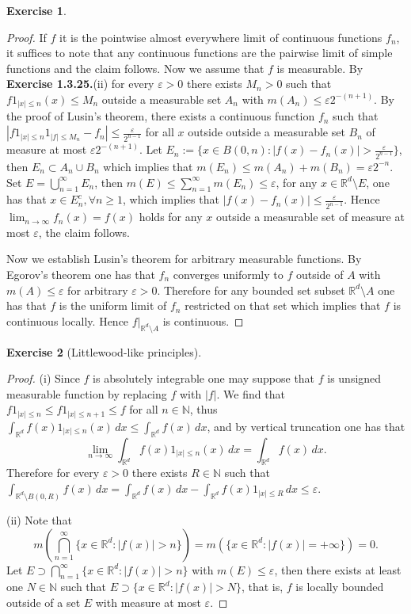 \documentclass[a4paper]{article}
\newtheorem{ex}{Exercise}[subsection]
\begin{document}
\begin{ex}\end{ex}\begin{proof}
If $f$ it is the pointwise almost everywhere limit of continuous functions $f_n$, it suffices to note that any continuous
functions are the pairwise limit of simple functions and the claim follows. Now we assume that $f$ is measurable.
By {\bfseries Exercise 1.3.25.}(ii) for every $\varepsilon > 0$ there exists $M_n > 0$ such that $f1_{|x| \leq n}(x) \leq M_n$
outside a measurable set $A_n$ with $m(A_n) \leq\varepsilon 2^{-(n + 1)}$. By the proof of Lusin's theorem, there
exists a continuous function $f_n$ such that $|f1_{|x| \leq n}1_{|f| \leq M_n} - f_n| \leq \frac{\varepsilon}{2^{n - 1}}$
for all $x$ outside outside a measurable set $B_n$ of measure at most $\varepsilon 2^{-(n + 1)}$. Let $E_n := \{
x \in B(0, n) : |f(x) - f_n(x)| > \frac{\varepsilon}{2^{n - 1}}\}$, then $E_n \subset A_n \cup B_n$ which implies that
$m(E_n) \leq m(A_n) + m(B_n) = \varepsilon 2^{-n}$. Set $E = \bigcup_{n = 1}^\infty E_n$, then $m(E) \leq \sum_{n = 1}
^\infty m(E_n) \leq \varepsilon$, for any $x \in \mathbb{R}^d \setminus E$, one has that $x \in E_n^c, \forall n \geq 1$,
which implies that $|f(x) - f_n(x)| \leq \frac{\varepsilon}{2^{n - 1}}$. Hence $\lim_{n \to \infty} f_n(x) = f(x)$ holds
for any $x$ outside a measurable set of measure at most $\varepsilon$, the claim follows.

Now we establish Lusin’s theorem for arbitrary measurable functions. By Egorov's theorem one has that $f_n$ converges
uniformly to $f$ outside of $A$ with $m(A) \leq \varepsilon$ for arbitrary $\varepsilon > 0$. Therefore for any 
bounded set subset $\mathbb{R}^d \setminus A$ one has that $f$ is the uniform limit of $f_n$ restricted on that set
which implies that $f$ is continuous locally. Hence $f|_{\mathbb{R}^d \setminus A}$ is continuous.
\end{proof}

\begin{ex}[Littlewood-like principles]\end{ex}
\begin{proof}
(i) Since $f$ is absolutely integrable one may suppose that $f$ is unsigned measurable function by replacing $f$ with $|f|$.
We find that $f1_{|x| \leq n} \leq f1_{|x| \leq n + 1} \leq f$ for all $n \in \mathbb{N}$, thus $\int_{\mathbb{R}^d}f(x)1_{|x| \leq n}
(x)\,dx \leq \int_{\mathbb{R}^d} f(x)\,dx$, and by vertical truncation one has that $$\lim_{n \to \infty} \int_{\mathbb{R}^d}f(x)1_{|x| \leq n}
(x)\,dx = \int_{\mathbb{R}^d}f(x)\,dx.$$ Therefore for every $\varepsilon > 0$ there exists $R \in \mathbb{N}$ such 
that $\int_{\mathbb{R}^d \setminus B(0, R)} f(x)\,dx = \int_{\mathbb{R}^d}f(x)\,dx - \int_{\mathbb{R}^d} f(x)1_{|x| \leq R}\,dx \leq \varepsilon$.

(ii) Note that $$
m(\bigcap_{n = 1}^\infty \{x \in \mathbb{R}^d : |f(x)| > n\}) = m(\{x \in \mathbb{R}^d : |f(x)| = +\infty\}) = 0.
$$Let $E \supset \bigcap_{n = 1}^\infty \{x \in \mathbb{R}^d : |f(x)| > n\}$ with $m(E) \leq \varepsilon$, then
there exists at least one $N \in \mathbb{N}$ such that $E \supset \{x \in \mathbb{R}^d : |f(x)| > N\}$, that is,
$f$ is locally bounded outside of a set $E$ with measure at most $\varepsilon$.
\end{proof}
\end{document}
